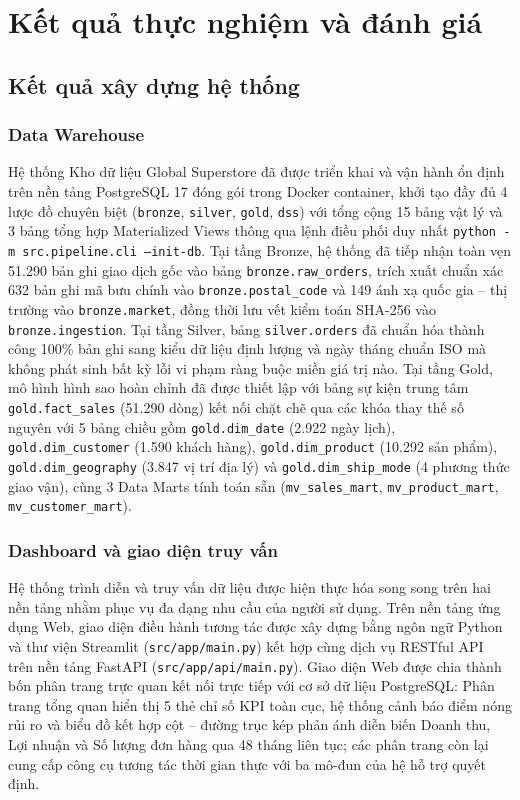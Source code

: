 \section{Kết quả thực nghiệm và đánh giá}

\subsection{Kết quả xây dựng hệ thống}

\subsubsection{Data Warehouse}

Hệ thống Kho dữ liệu Global Superstore đã được triển khai và vận hành ổn định trên nền tảng PostgreSQL 17 đóng gói trong Docker container, khởi tạo đầy đủ 4 lược đồ chuyên biệt (\texttt{bronze}, \texttt{silver}, \texttt{gold}, \texttt{dss}) với tổng cộng 15 bảng vật lý và 3 bảng tổng hợp Materialized Views thông qua lệnh điều phối duy nhất \texttt{python -m src.pipeline.cli --init-db}. Tại tầng Bronze, hệ thống đã tiếp nhận toàn vẹn 51.290 bản ghi giao dịch gốc vào bảng \texttt{bronze.raw\_orders}, trích xuất chuẩn xác 632 bản ghi mã bưu chính vào \texttt{bronze.postal\_code} và 149 ánh xạ quốc gia -- thị trường vào \texttt{bronze.market}, đồng thời lưu vết kiểm toán SHA-256 vào \texttt{bronze.ingestion}. Tại tầng Silver, bảng \texttt{silver.orders} đã chuẩn hóa thành công 100\% bản ghi sang kiểu dữ liệu định lượng và ngày tháng chuẩn ISO mà không phát sinh bất kỳ lỗi vi phạm ràng buộc miền giá trị nào. Tại tầng Gold, mô hình hình sao hoàn chỉnh đã được thiết lập với bảng sự kiện trung tâm \texttt{gold.fact\_sales} (51.290 dòng) kết nối chặt chẽ qua các khóa thay thế số nguyên với 5 bảng chiều gồm \texttt{gold.dim\_date} (2.922 ngày lịch), \texttt{gold.dim\_customer} (1.590 khách hàng), \texttt{gold.dim\_product} (10.292 sản phẩm), \texttt{gold.dim\_geography} (3.847 vị trí địa lý) và \texttt{gold.dim\_ship\_mode} (4 phương thức giao vận), cùng 3 Data Marts tính toán sẵn (\texttt{mv\_sales\_mart}, \texttt{mv\_product\_mart}, \texttt{mv\_customer\_mart}).

\subsubsection{Dashboard và giao diện truy vấn}

Hệ thống trình diễn và truy vấn dữ liệu được hiện thực hóa song song trên hai nền tảng nhằm phục vụ đa dạng nhu cầu của người sử dụng. Trên nền tảng ứng dụng Web, giao diện điều hành tương tác được xây dựng bằng ngôn ngữ Python và thư viện Streamlit (\texttt{src/app/main.py}) kết hợp cùng dịch vụ RESTful API trên nền tảng FastAPI (\texttt{src/app/api/main.py}). Giao diện Web được chia thành bốn phân trang trực quan kết nối trực tiếp với cơ sở dữ liệu PostgreSQL: Phân trang tổng quan hiển thị 5 thẻ chỉ số KPI toàn cục, hệ thống cảnh báo điểm nóng rủi ro và biểu đồ kết hợp cột -- đường trục kép phản ánh diễn biến Doanh thu, Lợi nhuận và Số lượng đơn hàng qua 48 tháng liên tục; các phân trang còn lại cung cấp công cụ tương tác thời gian thực với ba mô-đun của hệ hỗ trợ quyết định.

